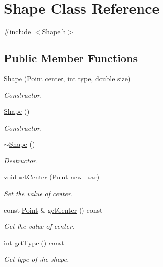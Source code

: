 \hypertarget{classShape}{\section{Shape Class Reference}
\label{classShape}
}


{\ttfamily \#include $<$Shape.\-h$>$}

\subsection*{Public Member Functions}
\begin{DoxyCompactItemize}
\item 
\hyperlink{classShape_a8e8680c7a68edeb2826e9e72cfa9adbf}{Shape} (\hyperlink{classPoint}{Point} center, int type, double size)
\begin{DoxyCompactList}\small\item\em Constructor. \end{DoxyCompactList}\item 
\hyperlink{classShape_aaa8d87171e65e0d8ba3c5459978992a7}{Shape} ()
\begin{DoxyCompactList}\small\item\em Constructor. \end{DoxyCompactList}\item 
\hyperlink{classShape_a935afc9e576015f967d90de56977167d}{$\sim$\-Shape} ()
\begin{DoxyCompactList}\small\item\em Destructor. \end{DoxyCompactList}\item 
void \hyperlink{classShape_aabf2fde36d48854cb10fbae4fe6ea0cf}{set\-Center} (\hyperlink{classPoint}{Point} new\-\_\-var)
\begin{DoxyCompactList}\small\item\em Set the value of center. \end{DoxyCompactList}\item 
const \hyperlink{classPoint}{Point} \& \hyperlink{classShape_a178ba40bdc7f20c1342f34450257f740}{get\-Center} () const 
\begin{DoxyCompactList}\small\item\em Get the value of center. \end{DoxyCompactList}\item 
int \hyperlink{classShape_ace78f87ad50bac4ea2592e730a7e9630}{get\-Type} () const 
\begin{DoxyCompactList}\small\item\em Get type of the shape. \end{DoxyCompactList}\item 

\end{DoxyCompactItemize}
